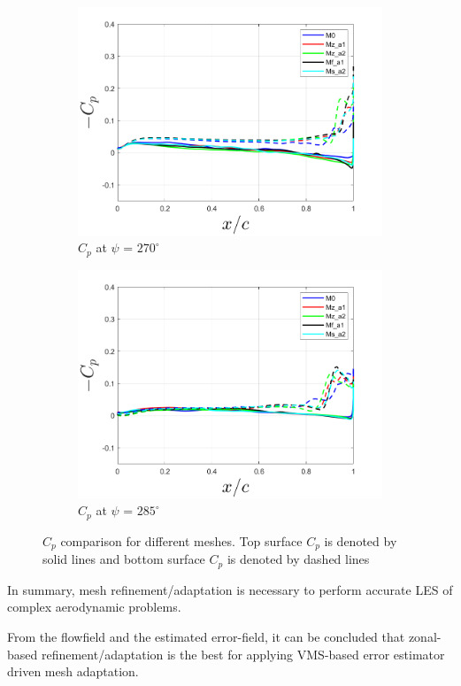 \begin{figure}[H]
\begin{subfigure}[b]{0.475\textwidth}
\includegraphics[width=1\textwidth]{figures/Results/Cp_plots/Cp_ph_270.png}
\caption{ $C_p$ at $\psi$ = $270^\circ$}
\label{fig:Cp_270}
\end{subfigure}
\begin{subfigure}[b]{0.475\textwidth}
\centering
\includegraphics[width=1\textwidth]{figures/Results/Cp_plots/Cp_ph_285.png}
\caption{ $C_p$ at $\psi$ = $285^\circ$}
\label{fig:Cp_285}
\end{subfigure}
\caption{$C_p$ comparison for different meshes. Top surface $C_p$ is denoted by solid lines and bottom surface $C_p$ is denoted by dashed lines}
\label{fig:Cp_plots}
\end{figure}


In summary, mesh refinement/adaptation is necessary to perform accurate LES of complex aerodynamic problems.

From the flowfield and the estimated error-field, it can be concluded that zonal-based refinement/adaptation is the best for applying VMS-based error estimator driven mesh adaptation.